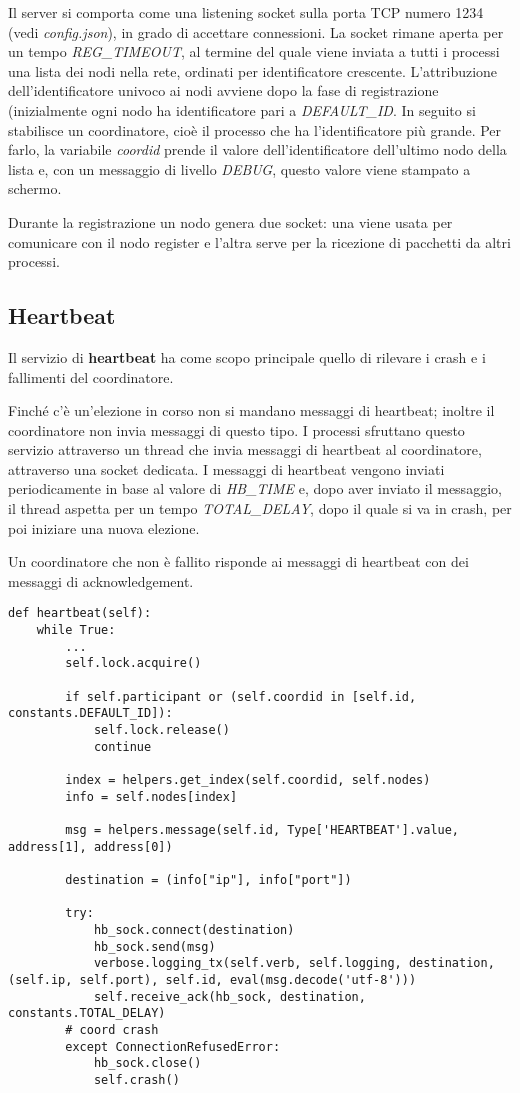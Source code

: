 \documentclass[conference]{IEEEtran}
\begin{document}
Il server si comporta come una listening socket sulla porta TCP numero 1234 (vedi \textit{config.json}), in grado di accettare connessioni.
La socket rimane aperta per un tempo \textit{REG\_TIMEOUT}, al termine del quale viene inviata a tutti i processi una lista dei nodi nella rete, ordinati per identificatore crescente.
L'attribuzione dell'identificatore univoco ai nodi avviene dopo la fase di registrazione (inizialmente ogni nodo ha identificatore pari a \textit{DEFAULT\_ID}.
In seguito si stabilisce un coordinatore, cioè il processo che ha l'identificatore più grande. Per farlo, la variabile \textit{coordid} prende il valore dell'identificatore dell'ultimo nodo della lista e, con un messaggio di livello \textit{DEBUG}, questo valore viene stampato a schermo.

Durante la registrazione un nodo genera due socket: una viene usata per comunicare con il nodo register e l'altra serve per la ricezione di pacchetti da altri processi.


\subsection{Heartbeat}\label{heartbeat}

Il servizio di \textbf{heartbeat} ha come scopo principale quello di rilevare i crash e i fallimenti del coordinatore.

Finché c'è un'elezione in corso non si mandano messaggi di heartbeat; inoltre il coordinatore non invia messaggi di questo tipo.
I processi sfruttano questo servizio attraverso un thread che invia messaggi di heartbeat al coordinatore, attraverso una socket dedicata.
I messaggi di heartbeat vengono inviati periodicamente in base al valore di \textit{HB\_TIME} e, dopo aver inviato il messaggio, il thread aspetta per un tempo \textit{TOTAL\_DELAY}, dopo il quale si va in crash, per poi iniziare una nuova elezione.

Un coordinatore che non è fallito risponde ai messaggi di heartbeat con dei messaggi di acknowledgement.

\begin{lstlisting}
def heartbeat(self):
    while True:
        ...
        self.lock.acquire()

        if self.participant or (self.coordid in [self.id, constants.DEFAULT_ID]):
            self.lock.release()
            continue

        index = helpers.get_index(self.coordid, self.nodes)
        info = self.nodes[index]

        msg = helpers.message(self.id, Type['HEARTBEAT'].value, address[1], address[0])

        destination = (info["ip"], info["port"])

        try:
            hb_sock.connect(destination)
            hb_sock.send(msg)
            verbose.logging_tx(self.verb, self.logging, destination, (self.ip, self.port), self.id, eval(msg.decode('utf-8')))
            self.receive_ack(hb_sock, destination, constants.TOTAL_DELAY)
        # coord crash
        except ConnectionRefusedError:
            hb_sock.close()
            self.crash()
\end{lstlisting}
\end{document}
